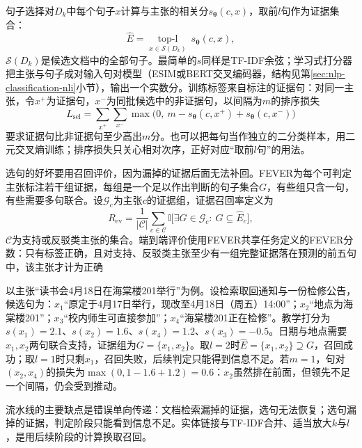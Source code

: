 句子选择对$D_k$中每个句子$x$计算与主张的相关分$s_{\bm\theta}(c,x)$，取前$l$句作为证据集合：
\begin{equation}
 \hat E=\operatorname*{top\text{-}l}_{x\in\mathcal{S}(D_k)}\ s_{\bm\theta}(c,x),
 \label{eq:nlp-dialogue-sentence-selection}
\end{equation}
$\mathcal{S}(D_k)$是候选文档中的全部句子。最简单的$s$同样是TF-IDF余弦；学习式打分器把主张与句子成对输入句对模型（ESIM或BERT交叉编码器，结构见第\ref{sec:nlp-classification-nli}小节），输出一个实数分。训练标签来自标注的证据句：对同一主张，令$x^+$为证据句，$x^-$为同批候选中的非证据句，以间隔为$m$的排序损失
\begin{equation}
 L_{\mathrm{sel}}=\sum_{x^+}\sum_{x^-}
 \max\bigl(0,\ m-s_{\bm\theta}(c,x^+)+s_{\bm\theta}(c,x^-)\bigr)
 \label{eq:nlp-dialogue-selection-loss}
\end{equation}
要求证据句比非证据句至少高出$m$分。也可以把每句当作独立的二分类样本，用二元交叉熵训练；排序损失只关心相对次序，正好对应“取前$l$句”的用法。

选句的好坏要用召回评价，因为漏掉的证据后面无法补回。FEVER为每个可判定主张标注若干组证据，每组是一个足以作出判断的句子集合$G$，有些组只含一句，有些需要多句联合。设$\mathcal{G}_c$为主张$c$的证据组，证据召回率定义为
\begin{equation}
 R_{\mathrm{ev}}=\frac{1}{|\mathcal{C}|}\sum_{c\in\mathcal{C}}
 \mathbb{I}\bigl[\exists G\in\mathcal{G}_c:\ G\subseteq\hat E_c\bigr],
 \label{eq:nlp-dialogue-evidence-recall}
\end{equation}
$\mathcal{C}$为支持或反驳类主张的集合。端到端评价使用FEVER共享任务定义的FEVER分数：只有标签正确，且对支持、反驳类主张至少有一组完整证据落在预测的前五句中，该主张才计为正确

以主张“读书会4月18日在海棠楼201举行”为例。设检索取回通知与一份检修公告，候选句为：$x_1$“原定于4月17日举行，现改至4月18日（周五）14:00”；$x_2$“地点为海棠楼201”；$x_3$“校内师生可直接参加”；$x_4$“海棠楼201正在检修”。教学打分为$s(x_1)=2.1$、$s(x_2)=1.6$、$s(x_4)=1.2$、$s(x_3)=-0.5$。日期与地点需要$x_1,x_2$两句联合支持，证据组为$G=\{x_1,x_2\}$。取$l=2$时$\hat E=\{x_1,x_2\}\supseteq G$，召回成功；取$l=1$时只剩$x_1$，召回失败，后续判定只能得到信息不足。若$m=1$，句对$(x_2,x_4)$的损失为$\max(0,1-1.6+1.2)=0.6$：$x_2$虽然排在前面，但领先不足一个间隔，仍会受到推动。

流水线的主要缺点是错误单向传递：文档检索漏掉的证据，选句无法恢复；选句漏掉的证据，判定阶段只能看到信息不足。实体链接与TF-IDF合并、适当放大$k$与$l$，是用后续阶段的计算换取召回。


